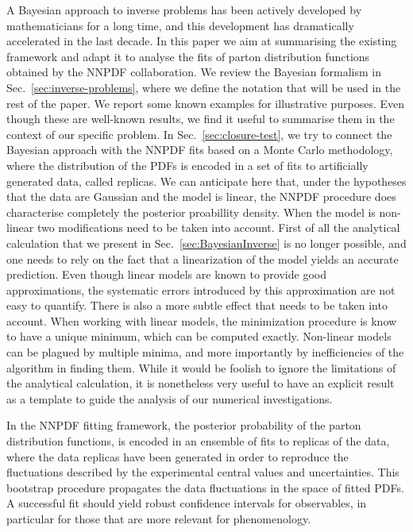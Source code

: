 A Bayesian approach to inverse problems has been actively developed by
mathematicians for a long time, and this development has dramatically
accelerated in the last decade. In this paper we aim at summarising the existing
framework and adapt it to analyse the fits of parton distribution functions
obtained by the NNPDF collaboration. We review the Bayesian formalism in
Sec.~\ref{sec:inverse-problems}, where we define the notation that will be used
in the rest of the
paper. We report some known examples for illustrative purposes. Even though
these are well-known results, we find it useful to summarise them in the context
of our specific problem. In Sec.~\ref{sec:closure-test}, we try to connect the
Bayesian approach
with the NNPDF fits based on a Monte Carlo methodology, where the distribution
of the PDFs is encoded in a set of fits to artificially generated data, called
replicas. We can anticipate here that, under the hypotheses that the data are
Gaussian and the model is linear, the NNPDF procedure does characterise
completely the posterior proabillity density. When the model is non-linear two
modifications need to be taken into account. First of all the analytical
calculation that we present in Sec.~\ref{sec:BayesianInverse} is no longer
possible, and one needs to rely on the fact that a linearization of the model
yields an accurate prediction. Even though linear models are known to provide
good approximations, the systematic errors introduced by this approximation are
not easy to quantify. There is also a more subtle effect that needs to be taken
into account. When working with linear models, the minimization procedure is
know to have a unique minimum, which can be computed exactly. Non-linear models
can be plagued by multiple minima, and more importantly by inefficiencies of the
algorithm in finding them. While it would be foolish to ignore the limitations
of the analytical calculation, it is nonetheless very useful to have an explicit
result as a template to guide the analysis of our numerical investigations. 

In the NNPDF fitting framework, the posterior probability of the parton
distribution functions, is encoded in an ensemble of fits to replicas of the
data, where the data replicas have been generated in order to reproduce the
fluctuations described by the experimental central values and uncertainties.
This bootstrap procedure propagates the data fluctuations in the space of fitted
PDFs. A successful fit should yield robust confidence intervals for observables,
in particular for those that are more relevant for phenomenology.

